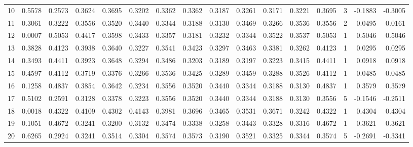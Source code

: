 \begin{tabular}{lrrrrrrrrrrrrrrr}
10  &      0.5578 &  0.2573 &  0.3624 &  0.3695 &  0.3202 &  0.3362 &  0.3362 &  0.3187 &  0.3261 &  0.3171 &   0.3221 &     0.3695 &      3 &                   -0.1883 &                    -0.3005 \\
11  &      0.3061 &  0.3222 &  0.3556 &  0.3520 &  0.3440 &  0.3344 &  0.3188 &  0.3130 &  0.3469 &  0.3266 &   0.3536 &     0.3556 &      2 &                    0.0495 &                     0.0161 \\
12  &      0.0007 &  0.5053 &  0.4417 &  0.3598 &  0.3433 &  0.3357 &  0.3181 &  0.3232 &  0.3344 &  0.3522 &   0.3537 &     0.5053 &      1 &                    0.5046 &                     0.5046 \\
13  &      0.3828 &  0.4123 &  0.3938 &  0.3640 &  0.3227 &  0.3541 &  0.3423 &  0.3297 &  0.3463 &  0.3381 &   0.3262 &     0.4123 &      1 &                    0.0295 &                     0.0295 \\
14  &      0.3493 &  0.4411 &  0.3923 &  0.3648 &  0.3294 &  0.3486 &  0.3203 &  0.3189 &  0.3197 &  0.3223 &   0.3415 &     0.4411 &      1 &                    0.0918 &                     0.0918 \\
15  &      0.4597 &  0.4112 &  0.3719 &  0.3376 &  0.3266 &  0.3536 &  0.3425 &  0.3289 &  0.3459 &  0.3288 &   0.3526 &     0.4112 &      1 &                   -0.0485 &                    -0.0485 \\
16  &      0.1258 &  0.4837 &  0.3854 &  0.3642 &  0.3234 &  0.3556 &  0.3520 &  0.3440 &  0.3344 &  0.3188 &   0.3130 &     0.4837 &      1 &                    0.3579 &                     0.3579 \\
17  &      0.5102 &  0.2591 &  0.3128 &  0.3378 &  0.3223 &  0.3556 &  0.3520 &  0.3440 &  0.3344 &  0.3188 &   0.3130 &     0.3556 &      5 &                   -0.1546 &                    -0.2511 \\
18  &      0.0018 &  0.4322 &  0.4109 &  0.4302 &  0.4143 &  0.3981 &  0.3696 &  0.3465 &  0.3531 &  0.3671 &   0.3242 &     0.4322 &      1 &                    0.4304 &                     0.4304 \\
19  &      0.1051 &  0.4672 &  0.3241 &  0.3200 &  0.3132 &  0.3474 &  0.3338 &  0.3258 &  0.3443 &  0.3328 &   0.3316 &     0.4672 &      1 &                    0.3621 &                     0.3621 \\
20  &      0.6265 &  0.2924 &  0.3241 &  0.3514 &  0.3304 &  0.3574 &  0.3573 &  0.3190 &  0.3521 &  0.3325 &   0.3344 &     0.3574 &      5 &                   -0.2691 &                    -0.3341 \\

\end{tabular}
